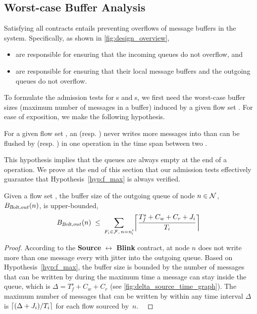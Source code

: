 \subsection{Worst-case Buffer Analysis}
\label{subsec:WC_buffer}

Satisfying all contracts entails preventing overflows of message buffers in the system.
Specifically, as shown in \cref{fig:design_overview},
\begin{itemize}
	\item \APs are responsible for ensuring that the incoming \bolt queues do not overflow, and
	\item \CPs are responsible for ensuring that their local message buffers and the outgoing \bolt queues do not overflow.
\end{itemize}

To formulate the admission tests for {\ap}s and {\cp}s, we first need the worst-case buffer sizes (\ie maximum number of messages in a buffer) induced by a given flow set \flowset.
For ease of exposition, we make the following hypothesis.
\begin{hypothesis}\label{hyp:f_max}
For a given flow set \flowset, an \ap (resp. \cp) never writes more messages into \bolt than can be flushed by \cp (resp. \ap) in one \emph{\opflush} operation in the time span between two \emph{\opflush}.
\end{hypothesis}
This hypothesis implies that the \bolt queues are always empty at the end of a \opflush operation.
We prove at the end of this section that our admission tests effectively guarantee that Hypothesis~\ref{hyp:f_max} is always verified.

\begin{lemma} \label{lem:buffer_bolt_out}
Given a flow set \flowset, the buffer size of the outgoing \bolt queue of node $n \in \nodeset$, $B_{\bolt,out}(n)$, is upper-bounded,
\begin{equation}
\label{eq:bolt_out_buffer_stress}
	B_{\bolt, out}(n) \; \leq \;
	\sum_{\substack{F_i\in \mathcal{F},\, n = \flowsrci}} \ceil*{\frac{T_f^s + C_w + C_r + \jitteri}{T_i}}
\end{equation}
\end{lemma}

\begin{proof}%
According to the \textbf{Source} $\boldsymbol{\leftrightarrow}$ \textbf{Blink} contract, \apsrc at node $n$ does not write more than one message every \periodi with jitter \jitteri into the outgoing \bolt queue.
Based on Hypothesis~\ref{hyp:f_max}, the buffer size is bounded by the number of messages that can be written by \apsrc during the maximum time a message can stay inside the queue, which is $\Delta = T_f^s + C_w + C_r$ (see \cref{fig:delta_source_time_graph}).
The maximum number of messages that can be written by \apsrc within any time interval $\Delta$ is $\ceil*{(\Delta + J_i)/{T_i}}$ for each flow \flowi sourced by~$n$. \
\end{proof}


